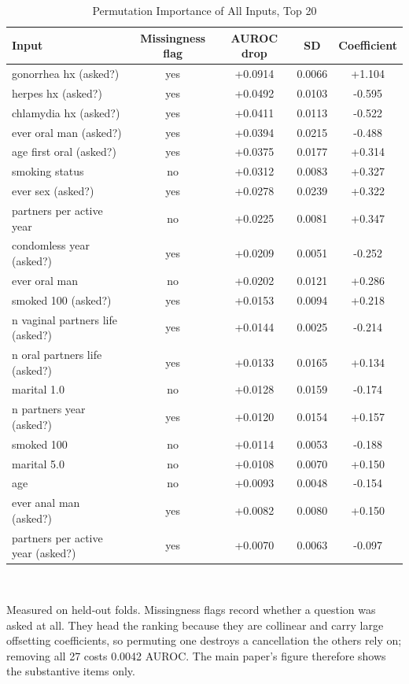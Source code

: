 \begin{table}[!htbp]
\caption{Permutation Importance of All Inputs, Top 20}
\label{tab:simportance}
\centering\footnotesize
\begin{tabular}{@{}lcccc@{}}
\toprule
Input & Missingness flag & AUROC drop & SD & Coefficient \\
\midrule
gonorrhea hx (asked?) & yes & +0.0914 & 0.0066 & +1.104 \\
herpes hx (asked?) & yes & +0.0492 & 0.0103 & -0.595 \\
chlamydia hx (asked?) & yes & +0.0411 & 0.0113 & -0.522 \\
ever oral man (asked?) & yes & +0.0394 & 0.0215 & -0.488 \\
age first oral (asked?) & yes & +0.0375 & 0.0177 & +0.314 \\
smoking status & no & +0.0312 & 0.0083 & +0.327 \\
ever sex (asked?) & yes & +0.0278 & 0.0239 & +0.322 \\
partners per active year & no & +0.0225 & 0.0081 & +0.347 \\
condomless year (asked?) & yes & +0.0209 & 0.0051 & -0.252 \\
ever oral man & no & +0.0202 & 0.0121 & +0.286 \\
smoked 100 (asked?) & yes & +0.0153 & 0.0094 & +0.218 \\
n vaginal partners life (asked?) & yes & +0.0144 & 0.0025 & -0.214 \\
n oral partners life (asked?) & yes & +0.0133 & 0.0165 & +0.134 \\
marital 1.0 & no & +0.0128 & 0.0159 & -0.174 \\
n partners year (asked?) & yes & +0.0120 & 0.0154 & +0.157 \\
smoked 100 & no & +0.0114 & 0.0053 & -0.188 \\
marital 5.0 & no & +0.0108 & 0.0070 & +0.150 \\
age & no & +0.0093 & 0.0048 & -0.154 \\
ever anal man (asked?) & yes & +0.0082 & 0.0080 & +0.150 \\
partners per active year (asked?) & yes & +0.0070 & 0.0063 & -0.097 \\
\bottomrule
\end{tabular}
\\[2pt]\begin{minipage}{\textwidth}\scriptsize Measured on held-out folds. Missingness flags record whether a question was asked at all. They head the ranking because they are collinear and carry large offsetting coefficients, so permuting one destroys a cancellation the others rely on; removing all 27 costs 0.0042 AUROC. The main paper's figure therefore shows the substantive items only.\end{minipage}
\end{table}
